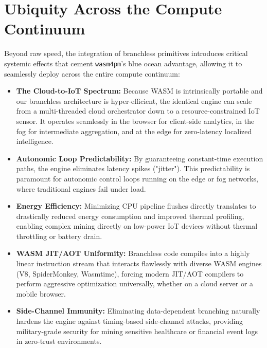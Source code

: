 \documentclass[12pt,a4paper]{report}
\begin{document}
\section{Ubiquity Across the Compute Continuum}
Beyond raw speed, the integration of branchless primitives introduces critical systemic effects that cement \texttt{wasm4pm}'s blue ocean advantage, allowing it to seamlessly deploy across the entire compute continuum:

\begin{itemize}
    \item \textbf{The Cloud-to-IoT Spectrum:} Because WASM is intrinsically portable and our branchless architecture is hyper-efficient, the identical engine can scale from a multi-threaded cloud orchestrator down to a resource-constrained IoT sensor. It operates seamlessly in the browser for client-side analytics, in the fog for intermediate aggregation, and at the edge for zero-latency localized intelligence.
    \item \textbf{Autonomic Loop Predictability:} By guaranteeing constant-time execution paths, the engine eliminates latency spikes ("jitter"). This predictability is paramount for autonomic control loops running on the edge or fog networks, where traditional engines fail under load.
    \item \textbf{Energy Efficiency:} Minimizing CPU pipeline flushes directly translates to drastically reduced energy consumption and improved thermal profiling, enabling complex mining directly on low-power IoT devices without thermal throttling or battery drain.
    \item \textbf{WASM JIT/AOT Uniformity:} Branchless code compiles into a highly linear instruction stream that interacts flawlessly with diverse WASM engines (V8, SpiderMonkey, Wasmtime), forcing modern JIT/AOT compilers to perform aggressive optimization universally, whether on a cloud server or a mobile browser.
    \item \textbf{Side-Channel Immunity:} Eliminating data-dependent branching naturally hardens the engine against timing-based side-channel attacks, providing military-grade security for mining sensitive healthcare or financial event logs in zero-trust environments.
\end{itemize}
\end{document}
